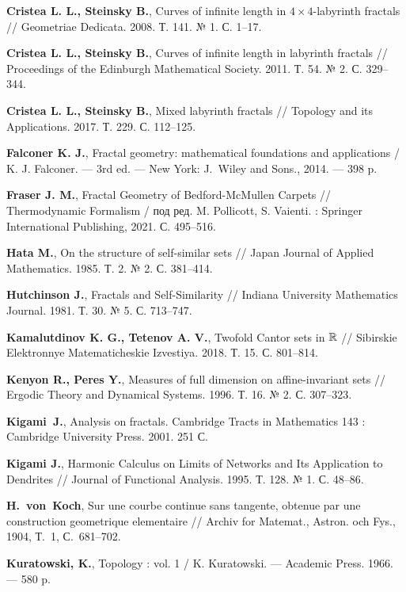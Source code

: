 \begin{thebibliography}{99}
{\bf Cristea L. L., Steinsky B.},
Curves of infinite length in $4\times4$-labyrinth fractals // 
Geometriae Dedicata. 2008. Т. 141. № 1. С. 1--17.


{\bf Cristea L. L., Steinsky B.},
Curves of infinite length in labyrinth fractals // 
Proceedings of the Edinburgh Mathematical Society. 2011. Т. 54. № 2. С. 329--344.


{\bf Cristea L. L., Steinsky B.},
Mixed labyrinth fractals // 
Topology and its Applications. 2017. Т. 229. С. 112--125.

{\bf Falconer K. J.},
Fractal geometry: mathematical foundations and applications / 
K. J. Falconer. --- 3rd ed. --- New York: J.~Wiley and Sons., 2014. --- 398 p.

{\bf Fraser J. M.},
Fractal Geometry of Bedford-McMullen Carpets // 
Thermodynamic Formalism / под ред. M. Pollicott, S. Vaienti. : Springer International Publishing, 2021. С. 495--516.

{\bf Hata M.},
On the structure of self-similar sets // 
Japan Journal of Applied Mathematics. 1985. Т. 2. № 2. С. 381--414.

{\bf Hutchinson J.},
Fractals and Self-Similarity // 
Indiana University Mathematics Journal. 1981. Т. 30. № 5. С. 713--747.

{\bf Kamalutdinov K. G., Tetenov A. V.},
Twofold Cantor sets in $\mathbb{R}$ // 
Sibirskie Elektronnye Matematicheskie Izvestiya. 2018. Т. 15. С. 801--814.

{\bf Kenyon R., Peres Y.}, 
Measures of full dimension on affine-invariant sets // 
Ergodic Theory and Dynamical Systems. 1996. Т. 16. № 2. С. 307--323.

{\bf Kigami~J.}, 
Analysis on fractals. Cambridge Tracts in Mathematics 143 : 
Cambridge University Press. 2001. 251 С.

{\bf Kigami J.}, 
Harmonic Calculus on Limits of Networks and Its Application to Dendrites // 
Journal of Functional Analysis. 1995. Т. 128. № 1. С. 48--86.

{\bf H.~von~Koch},  
Sur une courbe continue sans tangente, obtenue par
une construction geometrique elementaire // 
Archiv for Matemat., Astron. och Fys., 1904, Т.~1, С.~681--702.

{\bf Kuratowski, K.}, 
Topology : vol. 1 / 
K. Kuratowski. --- Academic Press. 1966. --- 580 p.


\end{thebibliography}
